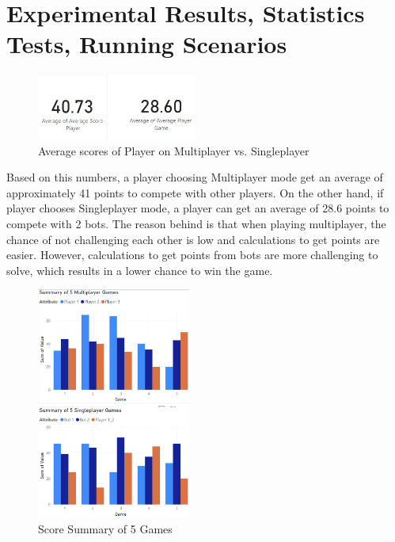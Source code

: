 \documentclass[conference]{IEEEtran}
\begin{document}
\section{Experimental Results, Statistics Tests, Running Scenarios}
    \begin{figure}[h!]
        \centering
        \includegraphics[width=0.47\textwidth]{img/Screenshot 2025-01-18 152405.png} %
        \caption{Average scores of Player on Multiplayer vs. Singleplayer
        }
        \label{fig:case}
    \end{figure}
    
    Based on this numbers, a player choosing Multiplayer mode get an average of approximately 41 points to compete with other players. On the other hand, if player chooses Singleplayer mode, a player can get an average of 28.6 points to compete with 2 bots. The reason behind is that when playing multiplayer, the chance of not challenging each other is low and calculations to get points are easier. However, calculations to get points from bots are more challenging to solve, which results in a lower chance to win the game.


    
    \begin{figure}[h!]
        \centering
        \includegraphics[width=0.45\textwidth]{img/Screenshot 2025-01-18 152209.png} %
        \caption{Score Summary of 5 Games
        }
        \label{fig:case}
    \end{figure}
\end{document}
